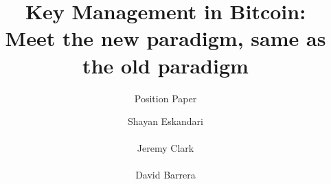 \documentclass{acm_proc_article-sp}
\begin{document}
\title{Key Management in Bitcoin: \\Meet the new paradigm, same as the old paradigm }
\subtitle{Position Paper}

\author{
\alignauthor Shayan Eskandari\\
       \\
\alignauthor Jeremy Clark\\
       \\
\alignauthor David Barrera\\
       \\
}

\maketitle




















\nocite{*}


\balancecolumns
\end{document}
